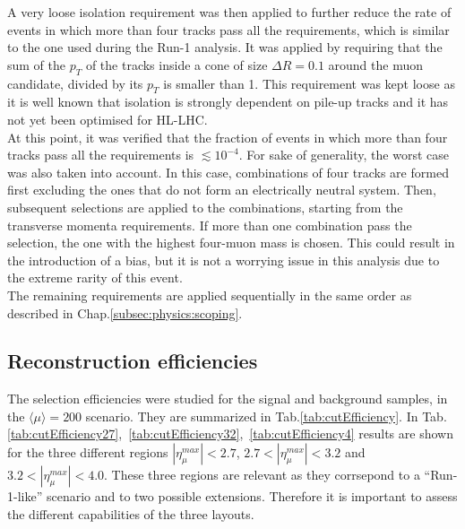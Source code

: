 \documentclass[a4paper,twoside,12pt]{book}
\begin{document}
A very loose isolation requirement was then applied to further reduce the rate of events
in which more than four tracks pass all the requirements, which is similar to the one used during
the Run-1 analysis\cite{HZZ4mu_run1}. It was applied by requiring that the sum of the 
$p_T$ of the tracks inside a cone of size $\Delta R = 0.1$ around the muon
candidate, divided by its $p_T$ is smaller than 1. This requirement was kept loose as 
it is well known that isolation is strongly dependent on pile-up tracks and it has not yet
been optimised for HL-LHC.\\

At this point, it was verified that the fraction of events in which more than four tracks
pass all the requirements is $\lesssim 10^{-4}$. For sake of generality, the worst 
case was also taken into account. In this case, combinations of four tracks are formed
first excluding the ones that do not form an electrically neutral system. Then, subsequent
selections are applied to the combinations, starting from the transverse momenta requirements. If more
than one combination pass the selection, the one with the highest four-muon mass is chosen. 
This could result in the introduction of a bias, but it is not a worrying issue in this analysis due to
the extreme rarity of this event.\\

The remaining requirements are applied sequentially in the same order as described in Chap.\ref{subsec:physics:scoping}.

\subsection{Reconstruction efficiencies}\label{subsec:recoEfficiency}

The selection efficiencies were studied for the signal and background samples, in the $\langle\mu\rangle = 200$ scenario. They are summarized in 
Tab.\ref{tab:cutEfficiency}. In \mbox{Tab.\ref{tab:cutEfficiency27}, \ref{tab:cutEfficiency32}, \ref{tab:cutEfficiency4}} results are shown for the three different regions $|\eta_{\mu}^{max}| < 2.7$, 
$2.7 < |\eta_{\mu}^{max}| < 3.2$ and $3.2 < |\eta_{\mu}^{max}| < 4.0$. These three regions are relevant as they corrsepond to a ``Run-1-like'' scenario and to two possible extensions. Therefore
it is important to assess the different capabilities of the three layouts.\\
\end{document}
